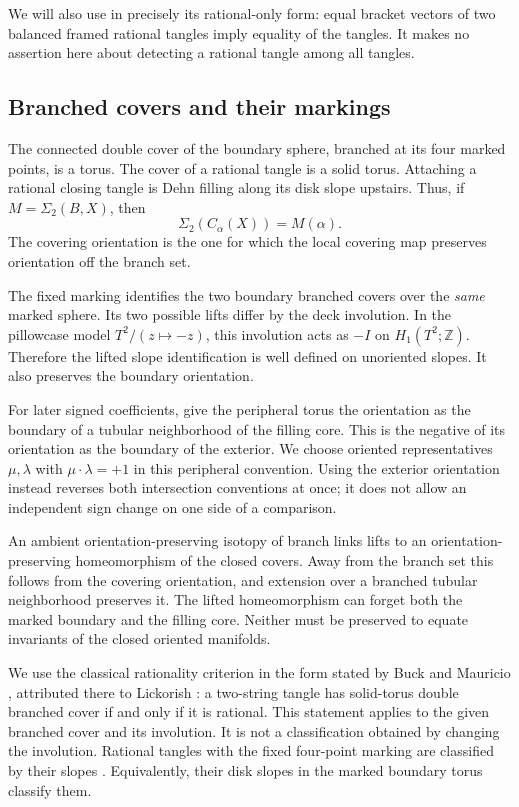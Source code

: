 \documentclass[11pt]{amsart}
\theoremstyle{definition}
\theoremstyle{remark}
\newcommand{\Z}{\mathbb Z}
\newcommand{\cl}[2]{C_{#1}(#2)}
\begin{document}
We will also use \cite[Corollary~20]{Sikora} in precisely its
rational-only form: equal bracket vectors of two balanced framed
rational tangles imply equality of the tangles.
It makes no assertion here about detecting a rational tangle
among all tangles.

\subsection{Branched covers and their markings}

The connected double cover of the boundary sphere, branched at
its four marked points, is a torus. The cover of a
rational tangle is a solid torus. Attaching a rational closing
tangle is Dehn filling along its disk slope upstairs. Thus, if
\(M=\Sigma_2(B,X)\), then
\begin{equation}\label{eq:coverclosure}
 \Sigma_2(\cl\alpha X)=M(\alpha).
\end{equation}
The covering orientation is the one for which the local covering
map preserves orientation off the branch set.

The fixed marking identifies the two boundary branched covers
over the \emph{same} marked sphere. Its two possible lifts differ
by the deck involution. In the pillowcase model
\(T^2/(z\mapsto-z)\), this involution acts as \(-I\) on
\(H_1(T^2;\Z)\). Therefore the lifted slope identification is
well defined on unoriented slopes. It also preserves the boundary
orientation.

For later signed coefficients, give the peripheral torus the
orientation as the boundary of a tubular neighborhood of the
filling core. This is the negative of its orientation as the
boundary of the exterior. We choose oriented representatives
\(\mu,\lambda\) with
\(\mu\cdot\lambda=+1\) in this peripheral convention.
Using the exterior orientation instead reverses both
intersection conventions at once; it does not allow an
independent sign change on one side of a comparison.

An ambient orientation-preserving isotopy of branch links lifts
to an orientation-preserving homeomorphism of the closed covers.
Away from the branch set this follows from the covering
orientation, and extension over a branched tubular neighborhood
preserves it. The lifted homeomorphism can forget both the
marked boundary and the filling core. Neither must be preserved
to equate invariants of the closed oriented manifolds.

We use the classical rationality criterion in the form stated by
Buck and Mauricio \cite[Theorem~3.5(2)]{BM}, attributed there to
Lickorish \cite{Lickorish}: a two-string tangle has solid-torus
double branched cover if and only if it is rational.
This statement applies to the given branched cover and its
involution. It is not a classification obtained by changing the
involution. Rational tangles with the fixed four-point marking
are classified by their slopes
\cite[Theorem~3.6]{BM}. Equivalently, their disk slopes in the
marked boundary torus classify them.
\end{document}
